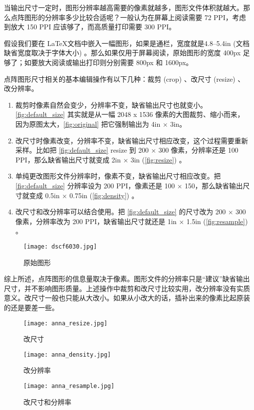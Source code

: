 当输出尺寸一定时，图形分辨率越高需要的像素就越多，图形文件体积就越大。那么点阵图形的分辨率多少比较合适呢？一般认为在屏幕上阅读需要 72 PPI，考虑到放大 150 PPI 应该够了，而高质量打印需要 300 PPI。

假设我们要在 \LaTeX 文档中嵌入一幅图形，如果是通栏，宽度就是4.8--5.4in (文档缺省宽度取决于字体大小) 。那么如果仅用于屏幕阅读，原始图形的宽度 400px 足够了；如要放大阅读或输出打印则分别需要 800px 和 1600px。

点阵图形尺寸相关的基本编辑操作有以下几种：裁剪 (crop) 、改尺寸 (resize) 、改分辨率。

\begin{enumerate}
\item 裁剪时像素自然会变少，分辨率不变，缺省输出尺寸也就变小。\autoref{fig:default_size} 其实就是从一幅 2048 x 1536 像素的大图裁剪、缩小而来，因为原图太大，\autoref{fig:original} 把它强制输出为 4in × 3in。

\item 改尺寸时像素改变，分辨率不变，缺省输出尺寸相应改变，这个过程需要重新采样。比如把 \autoref{fig:default_size} resize 到 200 × 300 像素，分辨率还是 100 PPI，那么缺省输出尺寸就变成 2in × 3in (\autoref{fig:resize}) 。

\item 单纯更改图形文件分辨率时，像素不变，缺省输出尺寸相应改变。把 \autoref{fig:default_size} 分辨率设为 200 PPI，像素还是 100 × 150，那么缺省输出尺寸就变成 0.5in × 0.75in (\autoref{fig:density}) 。

\item 改尺寸和改分辨率可以结合使用。把 \autoref{fig:default_size} 的尺寸改为 200 × 300 像素，分辨率改为 200 PPI，缺省输出尺寸就还是 1in × 1.5in (\autoref{fig:resample}) 。
\end{enumerate}

\begin{figure}[htbp]
\centering
\texttt{[image: dscf6030.jpg]}
\caption{原始图形}
\label{fig:original}
\end{figure}

综上所述，点阵图形的信息量取决于像素。图形文件的分辨率只是“建议”缺省输出尺寸，并不影响图形质量。上述操作中裁剪和改尺寸比较实用，改分辨率没有实质意义。改尺寸一般也只能从大改小。如果从小改大的话，插补出来的像素比起原装的还是要差一些。

\begin{figure}[htbp]
\centering
\begin{minipage}[b]{2in}
\centering
\texttt{[image: anna\_resize.jpg]}
\caption{改尺寸}
\label{fig:resize}
\end{minipage}
\begin{minipage}[b]{1.1in}
\centering
\texttt{[image: anna\_density.jpg]}
\caption{改分辨率}
\label{fig:density}
\end{minipage}
\begin{minipage}[b]{1.6in}
\centering
\texttt{[image: anna\_resample.jpg]}
\caption{改尺寸和分辨率}
\label{fig:resample}
\end{minipage}
\end{figure}

